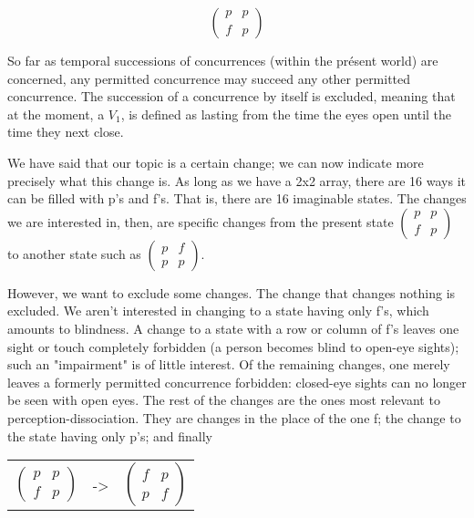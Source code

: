 $$\begin{pmatrix}
	p & p\\
	f & p 
\end{pmatrix}$$


So far as temporal successions of concurrences (within the présent 
world) are concerned, any permitted concurrence may succeed any other 
permitted concurrence. The succession of a concurrence by itself is 
excluded, meaning that at the moment, a $V_1$, is defined as lasting from the 
time the eyes open until the time they next close. 

We have said that our topic is a certain change; we can now indicate 
more precisely what this change is. As long as we have a 2x2 array, there are 
16 ways it can be filled with p's and f's. That is, there are 16 imaginable 
states. The changes we are interested in, then, are specific changes from the 
present state
$\begin{pmatrix}
	p & p \\
	f & p
\end{pmatrix}$ to another state such as
$\begin{pmatrix}
	p & f \\
	p & p
\end{pmatrix}$.

However, 
we want to exclude some changes. The change that changes nothing is 
excluded. We aren't interested in changing to a state having only f's, which 
amounts to blindness. A change to a state with a row or column of f's leaves 
one sight or touch completely forbidden (a person becomes blind to 
open-eye sights); such an "impairment" is of little interest. Of the remaining 
changes, one merely leaves a formerly permitted concurrence forbidden: 
closed-eye sights can no longer be seen with open eyes. The rest of the 
changes are the ones most relevant to perception-dissociation. They are 
changes in the place of the one f; the change to the state having only p's; 
and finally 


\begin{tabular}{ r c l }
	$\begin{pmatrix}
		p & p \\
		f & p
	\end{pmatrix}$ &
	->
	&
	$\begin{pmatrix}
		f & p \\
		p & f
	\end{pmatrix}$ \\
\end{tabular}

